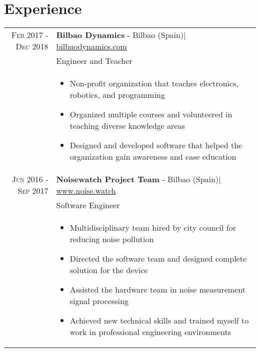 \documentclass[a4paper,10pt]{article}
\begin{document}

\vspace{-.1in}

\section{Experience}
\begin{tabular}{rp{13.3cm}}

 \textsc{Feb 2017 - Dec 2018}& \textbf{Bilbao Dynamics} - Bilbao (Spain)\href{https://bilbaodynamics.com/}{\hfill | \footnotesize bilbaodynamics.com}\\
 & Engineer and Teacher \\ 
 & \footnotesize{ \begin{itemize}[noitemsep,topsep=3pt]
 \vspace{-0.1in}
 \item Non-profit organization that teaches electronics, robotics, and programming
 \item Organized multiple courses and volunteered in teaching diverse knowledge areas
 \item Designed and developed software that helped the organization gain awareness and ease education

 \end{itemize}} \vspace{-0.09in} \\ 

 \textsc{Jun 2016 - Sep 2017}& \textbf{Noisewatch Project Team} - Bilbao (Spain)\href{http://noise.watch}{\hfill | \footnotesize www.noise.watch}\\
 & Software Engineer \\
 & \footnotesize{ \begin{itemize}[noitemsep,topsep=3pt]
 \vspace{-0.1in}
 \item Multidisciplinary team hired by city council for reducing noise pollution
 \item Directed the software team and designed complete solution for the device
 \item Assisted the hardware team in noise measurement signal processing
 \item Achieved new technical skills and trained myself to work in professional engineering environments
 \end{itemize}} \\


\end{tabular}
\end{document}

